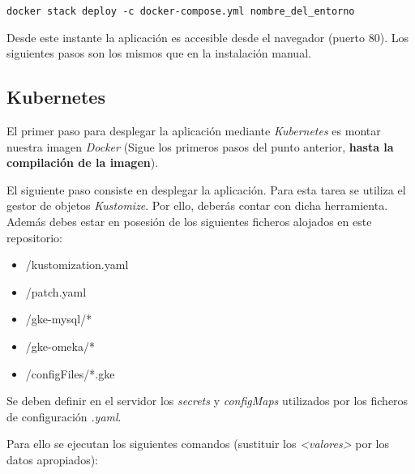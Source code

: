 \begin{verbatim}
docker stack deploy -c docker-compose.yml nombre_del_entorno
\end{verbatim} 

Desde este instante la aplicación es accesible desde el navegador
(puerto 80). Los siguientes pasos son los mismos que en la
instalación manual.

\subsection{Kubernetes}

El primer paso para desplegar la aplicación mediante \emph{Kubernetes}
es montar nuestra imagen \emph{Docker} (Sigue los primeros pasos del
punto anterior, \textbf{hasta la compilación de la imagen}).

El siguiente paso consiste en desplegar la aplicación. Para esta tarea
se utiliza el gestor de objetos \emph{Kustomize}. Por ello, deberás contar
con dicha herramienta. Además debes estar en posesión de los siguientes
ficheros alojados en este repositorio:

\begin{itemize}
\tightlist
\item
  /kustomization.yaml
\item
  /patch.yaml
\item
  /gke-mysql/*
\item
  /gke-omeka/*
\item
  /configFiles/*.gke
\end{itemize}

Se deben definir en el servidor los \emph{secrets} y \emph{configMaps} utilizados por los ficheros de configuración \emph{.yaml}.

Para ello se ejecutan los siguientes comandos (sustituir los \emph{<valores>} por los datos apropiados):

